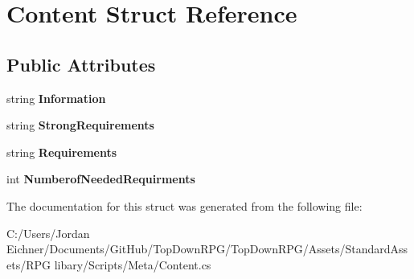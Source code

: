 \hypertarget{struct_content}{}\section{Content Struct Reference}
\label{struct_content}
\subsection*{Public Attributes}
\begin{DoxyCompactItemize}
\item 
\hypertarget{struct_content_a216f0b5c71894bbef26fc027895a8a39}{}string {\bfseries Information}\label{struct_content_a216f0b5c71894bbef26fc027895a8a39}

\item 
\hypertarget{struct_content_a8eee0e95f77c5d080aeab4a88cf5607d}{}string {\bfseries Strong\+Requirements}\label{struct_content_a8eee0e95f77c5d080aeab4a88cf5607d}

\item 
\hypertarget{struct_content_a8a0bbe78e06340e867bf694feddd4d1e}{}string {\bfseries Requirements}\label{struct_content_a8a0bbe78e06340e867bf694feddd4d1e}

\item 
\hypertarget{struct_content_a337b0374fcb40f66345cae16715e09d9}{}int {\bfseries Numberof\+Needed\+Requirments}\label{struct_content_a337b0374fcb40f66345cae16715e09d9}

\end{DoxyCompactItemize}


The documentation for this struct was generated from the following file\+:\begin{DoxyCompactItemize}
\item 
C\+:/\+Users/\+Jordan Eichner/\+Documents/\+Git\+Hub/\+Top\+Down\+R\+P\+G/\+Top\+Down\+R\+P\+G/\+Assets/\+Standard\+Assets/\+R\+P\+G libary/\+Scripts/\+Meta/Content.\+cs\end{DoxyCompactItemize}
